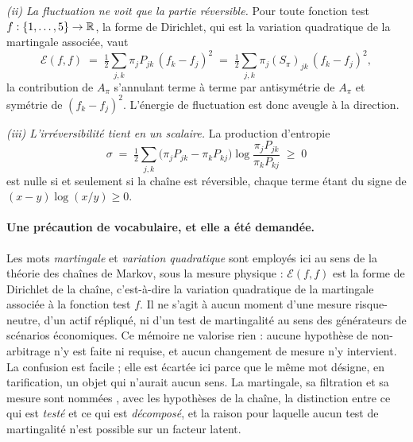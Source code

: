 \emph{(ii) La fluctuation ne voit que la partie réversible.} Pour toute fonction test
$f:\{1,\dots,5\}\to\mathbb{R}$, la forme de Dirichlet, qui est la variation quadratique de la martingale
associée, vaut
\begin{equation}
  \mathcal{E}(f,f) \;=\; \tfrac12\sum_{j,k}\pi_j P_{jk}\,(f_k-f_j)^2
                  \;=\; \tfrac12\sum_{j,k}\pi_j (S_\pi)_{jk}\,(f_k-f_j)^2 ,
  \label{eq:dirichlet}
\end{equation}
la contribution de $A_\pi$ s'annulant terme à terme par antisymétrie de $A_\pi$ et symétrie de
$(f_k-f_j)^2$. L'énergie de fluctuation est donc aveugle à la direction.

\emph{(iii) L'irréversibilité tient en un scalaire.} La production d'entropie
\begin{equation}
  \sigma \;=\; \tfrac12\sum_{j,k}\bigl(\pi_j P_{jk}-\pi_k P_{kj}\bigr)
                \log\frac{\pi_j P_{jk}}{\pi_k P_{kj}} \;\geq\; 0
  \label{eq:entropie}
\end{equation}
est nulle si et seulement si la chaîne est réversible, chaque terme étant du signe de
$(x-y)\log(x/y)\geq 0$.

\paragraph{Une précaution de vocabulaire, et elle a été demandée.} Les mots \emph{martingale} et
\emph{variation quadratique} sont employés ici au sens de la théorie des chaînes de Markov, sous
la mesure physique : $\mathcal{E}(f,f)$ est la forme de Dirichlet de la chaîne, c'est-à-dire
la variation quadratique de la martingale associée à la fonction test $f$. Il ne s'agit à aucun
moment d'une mesure risque-neutre, d'un actif répliqué, ni d'un \og{}test de
martingalité\fg{} au sens des générateurs de scénarios économiques. Ce mémoire ne valorise
rien : aucune hypothèse de non-arbitrage n'y est faite ni requise, et aucun changement de
mesure n'y intervient. La confusion est facile ; elle est écartée ici
parce que le même mot désigne, en tarification, un objet qui n'aurait aucun sens. La
martingale, sa filtration et sa mesure sont nommées \matcomp, avec les hypothèses de la
chaîne, la distinction entre ce qui est \emph{testé} et ce qui est \emph{décomposé}, et la
raison pour laquelle aucun test de martingalité n'est possible sur un facteur latent.


